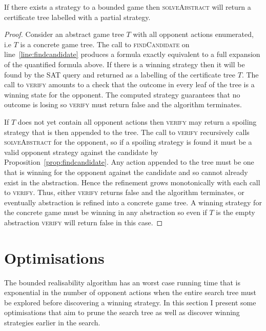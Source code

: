 \begin{theorem}\label{theorem:solveAbstract}
    If there exists a strategy to a bounded game then \textsc{solveAbstract} will return a certificate tree labelled with a partial strategy.
\end{theorem}
\begin{proof}
    Consider an abstract game tree $T$ with all opponent actions enumerated, i.e $T$ is a concrete game tree. The call to \textsc{findCandidate} on line~\ref{line:findcandidate} produces a formula exactly equivalent to a full expansion of the quantified formula above. If there is a winning strategy then it will be found by the SAT query and returned as a labelling of the certificate tree $T$. The call to \textsc{verify} amounts to a check that the outcome in every leaf of the tree is a winning state for the opponent. The computed strategy guarantees that no outcome is losing so \textsc{verify} must return false and the algorithm terminates.

    If $T$ does not yet contain all opponent actions then \textsc{verify} may return a spoiling strategy that is then appended to the tree. The call to \textsc{verify} recursively calls \textsc{solveAbstract} for the opponent, so if a spoiling strategy is found it must be a valid opponent strategy against the candidate by Proposition~\ref{prop:findcandidate}. Any action appended to the tree must be one that is winning for the opponent against the candidate and so cannot already exist in the abstraction. Hence the refinement grows monotonically with each call to \textsc{verify}. Thus, either \textsc{verify} returns false and the algorithm terminates, or eventually abstraction is refined into a concrete game tree. A winning strategy for the concrete game must be winning in any abstraction so even if $T$ is the empty abstraction \textsc{verify} will return false in this case.
\end{proof}

\section{Optimisations}

The bounded realisability algorithm has an worst case running time that is exponential in the number of opponent actions when the entire search tree must be explored before discovering a winning strategy. In this section I present some optimisations that aim to prune the search tree as well as discover winning strategies earlier in the search.

